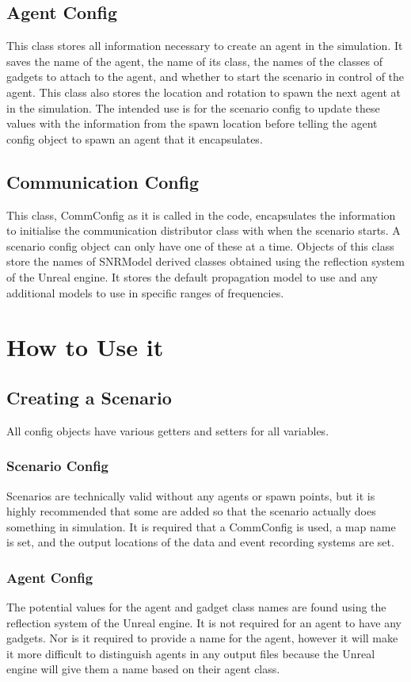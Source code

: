 \documentclass[../main.tex]{subfiles}
\begin{document}
\subsection{Agent Config}
This class stores all information necessary to create an agent in the simulation.
It saves the name of the agent, the name of its class, the names of the classes of gadgets to attach to the agent, and whether to start the scenario in control of the agent.
This class also stores the location and rotation to spawn the next agent at in the simulation.
The intended use is for the scenario config to update these values with the information from the spawn location before telling the agent config object to spawn an agent that it encapsulates.

\subsection{Communication Config}
This class, CommConfig as it is called in the code, encapsulates the information to initialise the communication distributor class with when the scenario starts.
A scenario config object can only have one of these at a time.
Objects of this class store the names of SNRModel derived classes obtained using the reflection system of the Unreal engine.
It stores the default propagation model to use and any additional models to use in specific ranges of frequencies.

\section{How to Use it}

\subsection{Creating a Scenario}
All config objects have various getters and setters for all variables.

\subsubsection{Scenario Config}
Scenarios are technically valid without any agents or spawn points, but it is highly recommended that some are added so that the scenario actually does something in simulation.
It is required that a CommConfig is used, a map name is set, and the output locations of the data and event recording systems are set.

\subsubsection{Agent Config}
The potential values for the agent and gadget class names are found using the reflection system of the Unreal engine.
It is not required for an agent to have any gadgets.
Nor is it required to provide a name for the agent, however it will make it more difficult to distinguish agents in any output files because the Unreal engine will give them a name based on their agent class.
\end{document}
